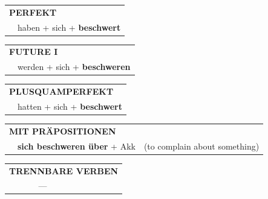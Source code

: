 \documentclass[10pt,a4paper]{revtex4-2}
\begin{document}
\begin{verbbox}
 \begin{tabular}{rl}
     \multicolumn{2}{l}{\textbf{PERFEKT}}\\
    &haben + sich + \textbf{beschwert}\\
  \end{tabular}
\hfill
   \begin{tabular}{rl}
   
    \multicolumn{2}{l}{\textbf{FUTURE I} }\\
    &werden + sich + \textbf{beschweren}\\
 
  \end{tabular}
\hfill
   \begin{tabular}{rl}
      \multicolumn{2}{l}{\textbf{PLUSQUAMPERFEKT}}\\
    &hatten + sich + \textbf{beschwert}\\
  \end{tabular}
  
\vspace{10pt}

   \begin{tabular}{lll}
      \multicolumn{3}{l}{\textbf{MIT PRÄPOSITIONEN}}\\
& \textbf{sich beschweren über} + Akk & (to complain about something)
  \end{tabular}
  \hfill
   \begin{tabular}{lll}
      \multicolumn{3}{l}{\textbf{TRENNBARE VERBEN}}\\
& --- & \\
  \end{tabular}
  
  \vspace{-5pt}

\end{verbbox}
\end{document}
